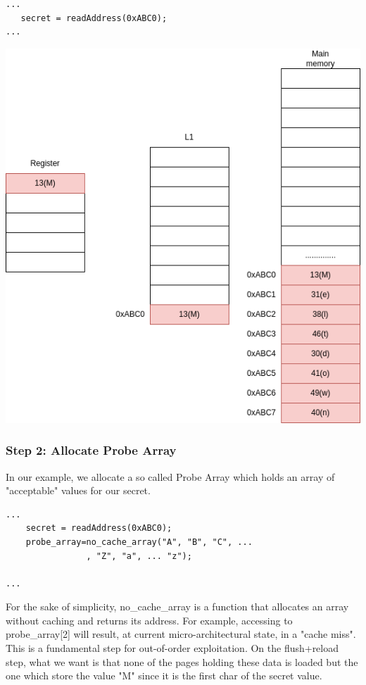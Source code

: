 \begin{verbatim}
...
   secret = readAddress(0xABC0);
...
\end{verbatim}
\includegraphics[scale=0.25]{img/meltdown-step-one.png}


\subsubsection{Step 2: Allocate Probe Array}
In our example, we allocate a so called Probe Array which holds an array of "acceptable" values for our secret.
\begin{verbatim}
...
    secret = readAddress(0xABC0);
    probe_array=no_cache_array("A", "B", "C", ... 
                , "Z", "a", ... "z");

...
\end{verbatim}
For the sake of simplicity, no\_cache\_array is a function that allocates an array without caching and returns its address.
For example, accessing to probe\_array[2] will result, at current micro-architectural state, in a "cache miss".
This is a fundamental step for out-of-order exploitation.
On the flush+reload step, what we want is that none of the pages holding these data is loaded but the one which store the value
"M" since it is the first char of the secret value.

